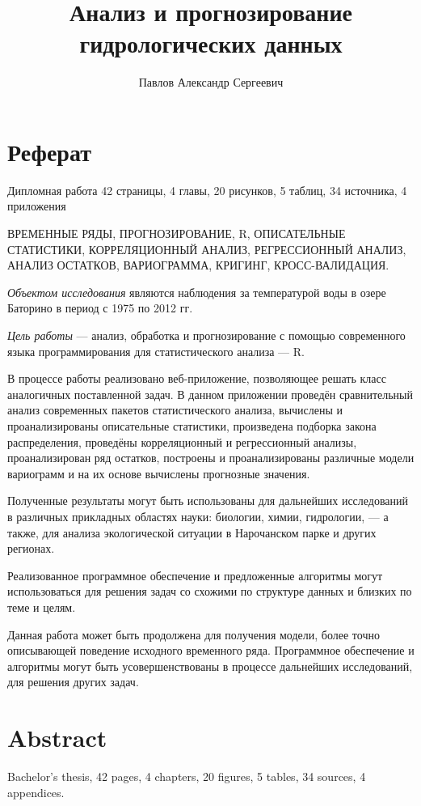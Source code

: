 \documentclass[a4paper,12pt]{report}
\title{Анализ и прогнозирование гидрологических данных}
\author{Павлов Александр Сергеевич}
\begin{document}
	\maketitle
	\newpage

	\chapter*{Реферат}
	Дипломная работа 42 страницы, 4 главы, 20 рисунков, 5 таблиц, 34 источника, 4 приложения

	ВРЕМЕННЫЕ РЯДЫ, ПРОГНОЗИРОВАНИЕ, R, ОПИСАТЕЛЬНЫЕ СТАТИСТИКИ, КОРРЕЛЯЦИОННЫЙ АНАЛИЗ, РЕГРЕССИОННЫЙ АНАЛИЗ, АНАЛИЗ ОСТАТКОВ, ВАРИОГРАММА, КРИГИНГ, КРОСС-ВАЛИДАЦИЯ.

	\textit{Объектом исследования} являются наблюдения за температурой воды в озере Баторино в период с 1975 по 2012 гг.

	\textit{Цель работы} --- анализ, обработка и прогнозирование с помощью современного языка программирования для статистического анализа --- R.

	В процессе работы реализовано веб-приложение, позволяющее решать класс аналогичных поставленной задач. В данном приложении проведён сравнительный анализ современных пакетов статистического анализа, вычислены и проанализированы описательные статистики, произведена подборка закона распределения, проведёны корреляционный и регрессионный анализы, проанализирован ряд остатков, построены и проанализированы различные модели вариограмм и на их основе вычислены прогнозные значения.

	Полученные результаты могут быть использованы для дальнейших исследований в различных прикладных областях науки: биологии, химии, гидрологии, --- а также, для анализа экологической ситуации в Нарочанском парке и других регионах.

	Реализованное программное обеспечение и предложенные алгоритмы могут использоваться для решения задач со схожими по структуре данных и близких по теме и целям.

	Данная работа может быть продолжена для получения модели, более точно описывающей поведение исходного временного ряда. Программное обеспечение и алгоритмы могут быть усовершенствованы в процессе дальнейших исследований, для решения других задач.

	\newpage

	\chapter*{Abstract}
	Bachelor's thesis, 42 pages, 4 chapters, 20 figures, 5 tables, 34 sources, 4 appendices.
\end{document}
